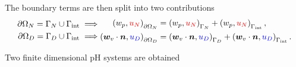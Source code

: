 \documentclass[aspectratio=169]{ISAE-Beamer}
\begin{document}
\begin{frame}
The boundary terms are then split into two contributions
\begin{equation*}
\begin{aligned}
\partial\Omega_N = \Gamma_N \cup \Gamma_{\text{int}} &\implies \\
\partial\Omega_D = \Gamma_D \cup \Gamma_{\text{int}} &\implies
\end{aligned}
\begin{aligned}
\left(w_p, \textcolor{red}{u_N} \right)_{\partial \Omega_N} &= \left(w_p, \textcolor{red}{u_N} \right)_{\Gamma_N} + \left(w_p, \textcolor{red}{u_N}\right)_{\Gamma_{\text{int}}}, \\
\left(\bm{w}_v \cdot \bm{n}, \textcolor{blue}{u_D} \right)_{\partial \Omega_D} &= \left(\bm{w}_v \cdot \bm{n}, \textcolor{blue}{u_D} \right)_{\Gamma_D} + \left(\bm{w}_v \cdot \bm{n}, \textcolor{blue}{u_D} \right)_{\Gamma_{\text{int}}}.
\end{aligned}
\end{equation*}

Two finite dimensional pH systems are obtained


\end{frame}
\end{document}
